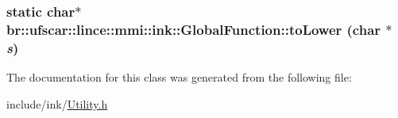 \label{classbr_1_1ufscar_1_1lince_1_1mmi_1_1ink_1_1GlobalFunction_a210632b3793a4a8d29cb11eb694548ea}
\hypertarget{classbr_1_1ufscar_1_1lince_1_1mmi_1_1ink_1_1GlobalFunction_ac28d7d2119005e2f55cfa28ec1efce13}{
\subsubsection[{toLower}]{\setlength{\rightskip}{0pt plus 5cm}static char$\ast$ br::ufscar::lince::mmi::ink::GlobalFunction::toLower (char $\ast$ {\em s})}}
\label{classbr_1_1ufscar_1_1lince_1_1mmi_1_1ink_1_1GlobalFunction_ac28d7d2119005e2f55cfa28ec1efce13}


The documentation for this class was generated from the following file:\begin{DoxyCompactItemize}
\item 
include/ink/\hyperlink{Utility_8h}{Utility.h}\end{DoxyCompactItemize}
